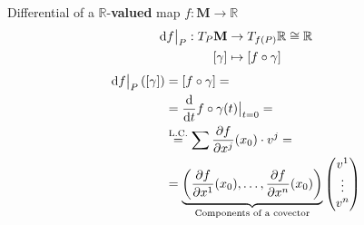 \documentclass[../main.tex]{subfiles}
\begin{document}
\begin{example}
Differential of a $\mathbb{R}$-\textbf{valued} map \(f:\mathbf{M}\to\mathbb{R}\)
\[
\begin{split}
\textrm{d}f\big|_P : T_P\mathbf{M}& \to  T_{f(P)}\mathbb{R}\cong\mathbb{R}\\
\qty[\gamma] &\mapsto \qty[f\circ \gamma]
\end{split}
\]
\[
\begin{split}
\textrm{d}f\big|_P\left(\qty[\gamma]\right)
&=\qty[f\circ\gamma]=\\
&=\frac{\textrm{d}}{\textrm{d}t}f\circ\gamma(t)\big|_{t=0}=\\
&\overset{\textrm{L.C.}}{=}\sum\frac{\partial f}{\partial x^j}(x_0)\cdot v^j=\\
&=\underbrace{\left(\frac{\partial f}{\partial x^1}(x_0),\dots, \frac{\partial f}{\partial x^n}(x_0)\right)}_{\mathclap{\text{Components of a covector}}}
\begin{pmatrix}
v^1\\
\vdots\\
v^n
\end{pmatrix}
\end{split}
\]
\end{example}
\end{document}
